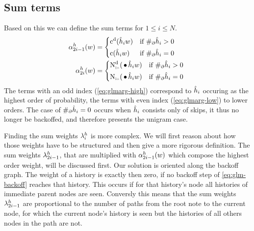 \subsection{Sum terms}

Based on this we can define the sum terms for $1 \leq i \leq N$.
\begin{subequations}
  \begin{align}
    \label{eq:glmarg-high}
    \SumArg_{2 i - 1}^h(w) &=
      \begin{dcases*}
        \DiscountedCount(\DerivedHistory[i] w)        & if $\NumSkpOp{\DerivedHistory[i]} > 0$ \\
        \Count(\DerivedHistory[i] w)                  & if $\NumSkpOp{\DerivedHistory[i]} = 0$
      \end{dcases*} \\
    \label{eq:glmarg-low}
    \SumArg_{2 i}^h(w) &=
      \begin{dcases*}
        \DiscountedCount*(\WSkp \DerivedHistory[i] w) & if $\NumSkpOp{\DerivedHistory[i]} > 0$ \\
        \ContCountIp(\WSkp \DerivedHistory[i] w)      & if $\NumSkpOp{\DerivedHistory[i]} = 0$
      \end{dcases*}
  \end{align}
\end{subequations}
The terms with an odd index (\cref{eq:glmarg-high}) correspond to
$\DerivedHistory[i]$ occuring as the highest order of probability, the terms
with even index (\cref{eq:glmarg-low}) to lower orders.
The case of $\NumSkpOp{\DerivedHistory[i]} = 0$ occurs when $\DerivedHistory[i]$
consists only of skips, it thus no longer be backoffed, and therefore
presents the unigram case.

Finding the sum weights $\lambda^h_i$ is more complex.
We will first reason about how those weights have to be structured and then
give a more rigorous definition.
The sum weights $\lambda^h_{2 i - 1}$, that are multiplied with
$\alpha^h_{2 i - 1}(w)$ which compose the highest order weight, will be
discussed first.
Our solution is oriented along the backoff graph.
The weight of a history is exactly then zero, if no backoff step of
\cref{eq:glm-backoff} reaches that history.
This occurs if for that history's node all histories of immediate parent nodes
are seen.
Conversly this means that the sum weights $\lambda^h_{2 i - 1}$ are proportional
to the number of paths from the root note to the current node, for which the
current node's history is seen but the histories of all others nodes in the
path are not.

